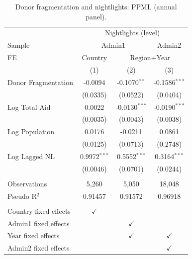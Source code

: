 
\begin{table}[htbp]
   \caption{\label{tab:annual_ppml_main} Donor fragmentation and nightlights: PPML (annual panel).}
   \bigskip
   \centering
   \begin{tabular}{lccc}
      \toprule
       & \multicolumn{3}{c}{Nightlights (level)}\\
      Sample & \multicolumn{2}{c}{Admin1} & Admin2 \\ 
      FE & Country & \multicolumn{2}{c}{Region+Year} \\ 
                            & (1)            & (2)             & (3)\\  
      \midrule 
      Donor Fragmentation   & -0.0094        & -0.1070$^{**}$  & -0.1586$^{***}$\\   
                            & (0.0335)       & (0.0522)        & (0.0404)\\   
      Log Total Aid         & 0.0022         & -0.0130$^{***}$ & -0.0190$^{***}$\\   
                            & (0.0035)       & (0.0043)        & (0.0038)\\   
      Log Population        & 0.0176         & -0.0211         & 0.0861\\   
                            & (0.0125)       & (0.0713)        & (0.2748)\\   
      Log Lagged NL         & 0.9972$^{***}$ & 0.5552$^{***}$  & 0.3164$^{***}$\\   
                            & (0.0046)       & (0.0701)        & (0.0244)\\   
       \\
      Observations          & 5,260          & 5,050           & 18,048\\  
      Pseudo R$^2$          & 0.91457        & 0.91572         & 0.96918\\  
       \\
      Country fixed effects & $\checkmark$   &                 & \\  
      Admin1 fixed effects  &                & $\checkmark$    & \\  
      Year fixed effects    &                & $\checkmark$    & $\checkmark$\\   
      Admin2 fixed effects  &                &                 & $\checkmark$\\   
      \bottomrule
   \end{tabular}
\end{table}


